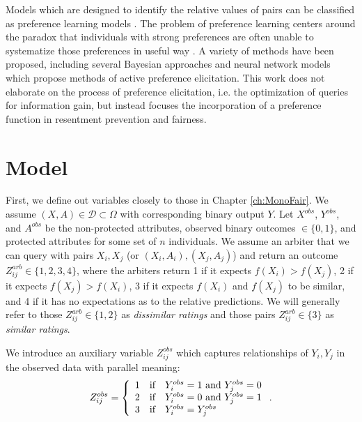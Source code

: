     Models which are designed to identify the relative values of pairs can be classified as preference learning models \citep{peters2018scalable}.  The problem of preference learning centers around the paradox that individuals with strong preferences are often unable to systematize those preferences in useful way  \citep{lichtenstein2006construction}.  A variety of methods have been proposed, including several Bayesian approaches \citep{peters2018scalable,guo2010gaussian} and neural network models  \citep{duman2019intelligent, khannoussi2019integrating} which propose methods of active preference elicitation.  This work does not elaborate on the process of preference elicitation, i.e. the optimization of queries for information gain, but instead focuses the incorporation of a preference function in resentment prevention and fairness.
    

\section{Model}\label{sec:softmono_model}

    First, we define out variables closely to those in Chapter \ref{ch:MonoFair}.  We assume $(X, A) \in \mathcal{D} \subset \Omega$ with corresponding binary output $Y$.  Let $X^{obs}$, $Y^{obs}$, and $A^{obs}$ be the non-protected attributes, observed binary outcomes $\in \{0, 1\}$, and protected attributes for some set of $n$ individuals.  We assume an arbiter that we can query with pairs $X_i, X_j$ (or $(X_i, A_i), (X_j, A_j)$) and return an outcome $Z_{ij}^{arb} \in \{1, 2, 3, 4\}$, where the arbiters return 1 if it expects $f(X_i) > f(X_j)$, 2 if it expects $f(X_j) > f(X_i)$, 3 if it expects $f(X_i)$ and $f(X_j)$ to be similar, and 4 if it has no expectations as to the relative predictions.  We will generally refer to those $Z_{ij}^{arb} \in \{1, 2\}$ as \emph{dissimilar ratings} and those pairs $Z_{ij}^{arb} \in \{3\}$ as \emph{similar ratings}.
    
    We introduce an auxiliary variable $Z_{ij}^{obs}$ which captures relationships of $Y_i, Y_j$ in the observed data with parallel meaning:
    $$ Z_{ij}^{obs} = \left\{ \begin{array}{l c l}
        1 & \mbox{if} & Y_i^{obs} = 1 \mbox{~and~} Y_j^{obs} = 0 \\
        2 & \mbox{if} & Y_i^{obs} = 0 \mbox{~and~} Y_j^{obs} = 1 \\
        3 & \mbox{if} & Y_i^{obs} = Y_j^{obs}
    \end{array}\right. .$$
    
